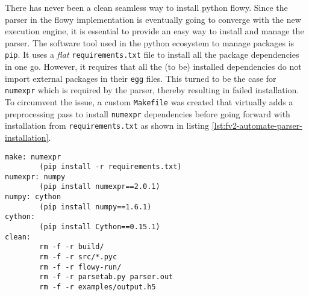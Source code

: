There has never been a clean seamless way to install python flowy.  Since the
parser in the flowy implementation is eventually going to converge with the
new execution engine, it is essential to provide an easy way to install and
manage the parser. The software tool used in the python ecosystem to manage
packages is \texttt{pip}. It uses a \emph{flat}  \texttt{requirements.txt} file to install all the package dependencies
in one go. However, it requires that all the (to be) installed dependencies do
not import external packages in their \texttt{egg} files. This turned to be
the case for \texttt{numexpr} which is required by the parser, thereby
resulting in failed installation.  To circumvent the issue, a custom
\texttt{Makefile} was created that virtually adds a preprocessing pass to
install \texttt{numexpr} dependencies before going forward with installation
from \texttt{requirements.txt} as shown in listing
\ref{lst:fv2-automate-parser-installation}.

\begin{lstlisting}
make: numexpr
        (pip install -r requirements.txt)
numexpr: numpy
        (pip install numexpr==2.0.1)
numpy: cython
        (pip install numpy==1.6.1)
cython:
        (pip install Cython==0.15.1)
clean:
        rm -f -r build/
        rm -f -r src/*.pyc
        rm -f -r flowy-run/
        rm -f -r parsetab.py parser.out
        rm -f -r examples/output.h5
\end{lstlisting}
